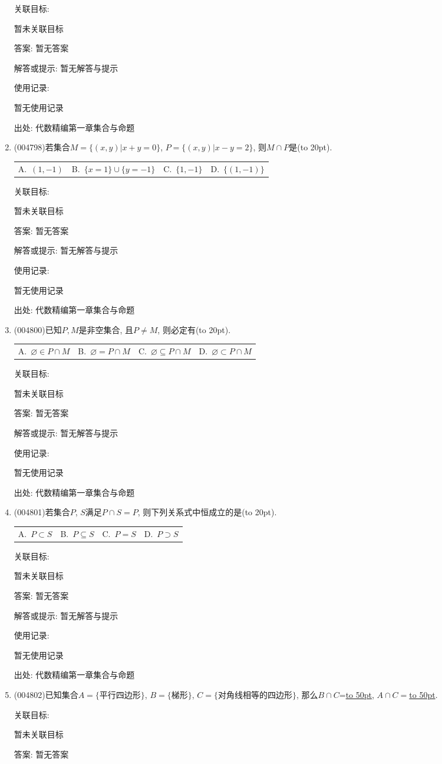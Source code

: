 \documentclass[10pt,a4paper]{article}
\newcommand{\blank}[1]{\underline{\hbox to #1pt{}}}
\newcommand{\bracket}[1]{(\hbox to #1pt{})}
\newcommand{\fourch}[4]{\par\begin{tabular}{p{.23\textwidth}p{.23\textwidth}p{.23\textwidth}p{.23\textwidth}}
A.~#1 &B.~#2& C.~#3& D.~#4
\end{tabular}}
\begin{document}
\begin{enumerate}[1.]
关联目标:

暂未关联目标

答案: 暂无答案

解答或提示: 暂无解答与提示

使用记录:

暂无使用记录


出处: 代数精编第一章集合与命题
\item { (004798)}若集合$M=\{(x,y)|x+y=0\}$, $P=\{(x,y)|x-y=2\}$, 则$M\cap P$是\bracket{20}.
\fourch{$(1,-1)$}{$\{x=1\}\cup \{y=-1\}$}{$\{1,-1\}$}{$\{(1,-1)\}$}


关联目标:

暂未关联目标

答案: 暂无答案

解答或提示: 暂无解答与提示

使用记录:

暂无使用记录


出处: 代数精编第一章集合与命题
\item { (004800)}已知$P,M$是非空集合, 且$P\ne M$, 则必定有\bracket{20}.
\fourch{$\varnothing \in P\cap M$}{$\varnothing=P\cap M$}{$\varnothing \subseteq P\cap M$}{$\varnothing \subset P\cap M$}


关联目标:

暂未关联目标

答案: 暂无答案

解答或提示: 暂无解答与提示

使用记录:

暂无使用记录


出处: 代数精编第一章集合与命题
\item { (004801)}若集合$P$, $S$满足$P\cap S=P$, 则下列关系式中恒成立的是\bracket{20}.
\fourch{$P\subset S$}{$P\subseteq S$}{$P=S$}{$P\supset S$}


关联目标:

暂未关联目标

答案: 暂无答案

解答或提示: 暂无解答与提示

使用记录:

暂无使用记录


出处: 代数精编第一章集合与命题
\item { (004802)}已知集合$A=\{\text{平行四边形}\}$, $B=\{\text{梯形}\}$, $C=\{\text{对角线相等的四边形}\}$, 那么$B\cap C$=\blank{50}, $A\cap C=$\blank{50}.


关联目标:

暂未关联目标

答案: 暂无答案


\end{enumerate}
\end{document}

